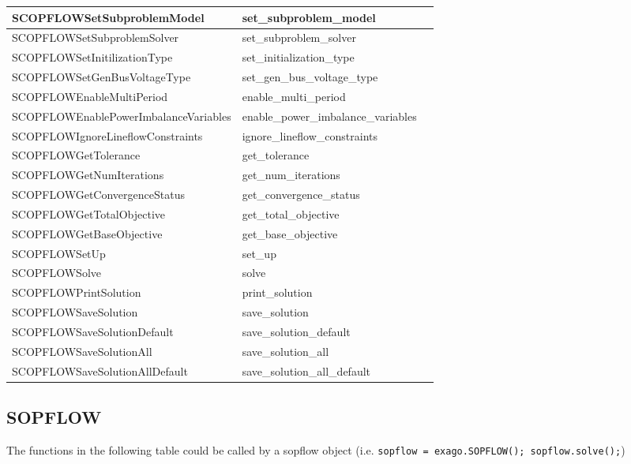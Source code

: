 {\begin{longtable}{|>{\ttfamily}p{}|>{\ttfamily}p{}|p{}|}
    SCOPFLOWSetSubproblemModel & set\_subproblem\_model &  \\ \hline
    SCOPFLOWSetSubproblemSolver & set\_subproblem\_solver &  \\ \hline
    SCOPFLOWSetInitilizationType & set\_initialization\_type &  \\ \hline
    SCOPFLOWSetGenBusVoltageType & set\_gen\_bus\_voltage\_type &  \\ \hline
    SCOPFLOWEnableMultiPeriod & enable\_multi\_period &  \\ \hline
    SCOPFLOWEnablePowerImbalanceVariables & enable\_power\_imbalance\_variables &  \\ \hline
    SCOPFLOWIgnoreLineflowConstraints & ignore\_lineflow\_constraints &  \\ \hline
    SCOPFLOWGetTolerance & get\_tolerance &  \\ \hline
    SCOPFLOWGetNumIterations & get\_num\_iterations &  \\ \hline
    SCOPFLOWGetConvergenceStatus & get\_convergence\_status &  \\ \hline
    SCOPFLOWGetTotalObjective & get\_total\_objective &  \\ \hline
    SCOPFLOWGetBaseObjective & get\_base\_objective &  \\ \hline
    SCOPFLOWSetUp & set\_up &  \\ \hline
    SCOPFLOWSolve & solve &  \\ \hline
    SCOPFLOWPrintSolution & print\_solution &  \\ \hline
    SCOPFLOWSaveSolution & save\_solution &  \\ \hline
    SCOPFLOWSaveSolutionDefault & save\_solution\_default &  \\ \hline
    SCOPFLOWSaveSolutionAll & save\_solution\_all &  \\ \hline
    SCOPFLOWSaveSolutionAllDefault & save\_solution\_all\_default &  \\ \hline

    \hline
  \end{longtable}
}
\subsection{SOPFLOW} 

The functions in the following table could be called by a sopflow object (i.e. \texttt{sopflow = exago.SOPFLOW(); sopflow.solve();})


